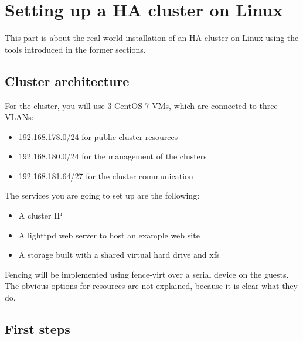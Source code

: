 


\section{Setting up a HA cluster on Linux}
This part is about the real world installation of an \ac{HA} cluster on Linux using the tools introduced in the former sections.

\subsection{Cluster architecture}
For the cluster, you will use 3 CentOS 7 \acp{VM}, which are connected
to three \acp{VLAN}: 
\begin{itemize}
\item 192.168.178.0/24 for public cluster resources
\item 192.168.180.0/24 for the management of the clusters
\item 192.168.181.64/27 for the cluster communication
\end{itemize}
The services you are going to set up are the following:
\begin{itemize}
\item A cluster IP
\item A lighttpd web server to host an example web site
\item A storage built with a shared virtual hard drive and xfs
\end{itemize}

Fencing will be implemented using fence-virt over a serial device
on the guests.
The obvious options for resources are not explained, because it is clear what they
do.
\subsection{First steps}

